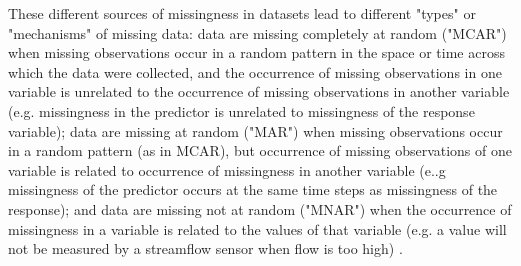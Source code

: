 \documentclass{article}
\begin{document}
These different sources of missingness in datasets lead to different "types" or "mechanisms" of missing data: data are missing completely at random ("MCAR") when missing observations occur in a random pattern in the space or time across which the data were collected, and the occurrence of missing observations in one variable is unrelated to the occurrence of missing observations in another variable (e.g. missingness in the predictor is unrelated to missingness of the response variable); data are missing at random ("MAR") when missing observations occur in a random pattern (as in MCAR), but occurrence of missing observations of one variable is related to occurrence of missingness in another variable (e..g missingness of the predictor occurs at the same time steps as missingness of the response); and data are missing not at random ("MNAR") when the occurrence of missingness in a variable is related to the values of that variable (e.g. a value will not be measured by a streamflow sensor when flow is too high) \citep{nakagawa_missing_2015, gelman_data_2006}.

\end{document}
